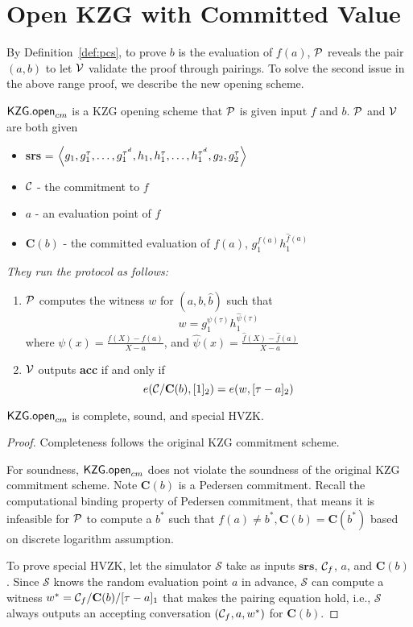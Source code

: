 \section{Open KZG with Committed Value}
\label{sec:kzgOpenComm}
By Definition~\ref{def:pcs}, to prove $b$ is the evaluation of $f(a)$, $\mathcal{P}$ reveals the pair $(a,b)$ to let $\mathcal{V}$ validate the proof through pairings. To solve the second issue in the above range proof, we describe the new opening scheme.
\begin{definition}[$\openc$]
$\openc$ is a KZG opening scheme that $\mathcal{P}$ is given input $f$ and $b$. $\mathcal{P}$ and $\mathcal{V}$ are both given
\begin{itemize}
    \item \textbf{srs} = $\left \langle g_1,g_1^\tau,\dots,g_1^{\tau^d},h_1,h_1^\tau,\dots,h_1^{\tau^d},g_2,g_2^\tau \right \rangle$
    \item $\mathcal{C}$ - the commitment to $f$
    \item $a$ - an evaluation point of $f$
    \item $\textbf{C}(b)$ - the committed evaluation of $f(a)$, $g_1^{f(a)}h_1^{\hat{f}(a)}$
\end{itemize}
\textit{They run the protocol as follows:}
\begin{enumerate}
    \item $\mathcal{P}$ computes the witness $w$ for $(a,b,\hat{b})$ such that
    \[ w=g_1^{\psi(\tau)}h_1^{\hat\psi(\tau)} \]
    where $\psi(x)=\frac{f(X)-f(a)}{X-a}$, and $\hat\psi(x)=\frac{\hat{f}(X)-\hat{f}(a)}{X-a}$
    \item $\mathcal{V}$ outputs \textbf{acc} if and only if
    \[ e(\mathcal{C}/\textbf{C}(b),[1]_2)=e(w,[\tau-a]_2) \]
\end{enumerate}
\end{definition}
\begin{theorem}
\label{thm:kzgOpen}
$\openc$ is complete, sound, and special HVZK.
\end{theorem}
\begin{proof}
Completeness follows the original KZG commitment scheme.

For soundness, $\openc$ does not violate the soundness of the original KZG commitment scheme. Note $\textbf{C}(b)$ is a Pedersen commitment. Recall the computational binding property of Pedersen commitment, that means it is infeasible for $\mathcal{P}$ to compute a $b^*$ such that $f(a)\ne{b^*},\textbf{C}(b)=\textbf{C}(b^*)$ based on discrete logarithm assumption.

To prove special HVZK, let the simulator $\mathcal{S}$ take as inputs $\textbf{srs}$, $\mathcal{C}_f$, $a$, and $\textbf{C}(b)$. Since $\mathcal{S}$ knows the random evaluation point $a$ in advance, $\mathcal{S}$ can compute a witness $w^*=\mathcal{C}_f/\textbf{C}(b)/[\tau-a]_1$ that makes the pairing equation hold, i.e., $\mathcal{S}$ always outputs an accepting conversation $(\mathcal{C}_f,a,w^*)$ for $\textbf{C}(b)$.
\end{proof}
